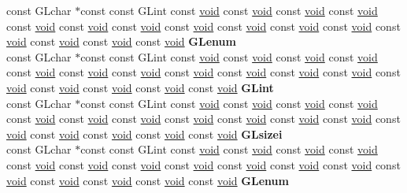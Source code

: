 \begin{DoxyCompactItemize}
\begin{tabbing}
\>const GLchar $\ast$const const GLint const \hyperlink{interfacevoid}{void} const \hyperlink{interfacevoid}{void} const \hyperlink{interfacevoid}{void} const \hyperlink{interfacevoid}{void} const \hyperlink{interfacevoid}{void} const \hyperlink{interfacevoid}{void} const \hyperlink{interfacevoid}{void} const \hyperlink{interfacevoid}{void} const \hyperlink{interfacevoid}{void} const \hyperlink{interfacevoid}{void} const \hyperlink{interfacevoid}{void} const \hyperlink{interfacevoid}{void} const \hyperlink{interfacevoid}{void} const \hyperlink{interfacevoid}{void} const \hyperlink{interfacevoid}{void} {\bfseries GLenum}\\
\>const GLchar $\ast$const const GLint const \hyperlink{interfacevoid}{void} const \hyperlink{interfacevoid}{void} const \hyperlink{interfacevoid}{void} const \hyperlink{interfacevoid}{void} const \hyperlink{interfacevoid}{void} const \hyperlink{interfacevoid}{void} const \hyperlink{interfacevoid}{void} const \hyperlink{interfacevoid}{void} const \hyperlink{interfacevoid}{void} const \hyperlink{interfacevoid}{void} const \hyperlink{interfacevoid}{void} const \hyperlink{interfacevoid}{void} const \hyperlink{interfacevoid}{void} const \hyperlink{interfacevoid}{void} const \hyperlink{interfacevoid}{void} const \hyperlink{interfacevoid}{void} {\bfseries GLint}\\
\>const GLchar $\ast$const const GLint const \hyperlink{interfacevoid}{void} const \hyperlink{interfacevoid}{void} const \hyperlink{interfacevoid}{void} const \hyperlink{interfacevoid}{void} const \hyperlink{interfacevoid}{void} const \hyperlink{interfacevoid}{void} const \hyperlink{interfacevoid}{void} const \hyperlink{interfacevoid}{void} const \hyperlink{interfacevoid}{void} const \hyperlink{interfacevoid}{void} const \hyperlink{interfacevoid}{void} const \hyperlink{interfacevoid}{void} const \hyperlink{interfacevoid}{void} const \hyperlink{interfacevoid}{void} const \hyperlink{interfacevoid}{void} const \hyperlink{interfacevoid}{void} {\bfseries GLsizei}\\
\>const GLchar $\ast$const const GLint const \hyperlink{interfacevoid}{void} const \hyperlink{interfacevoid}{void} const \hyperlink{interfacevoid}{void} const \hyperlink{interfacevoid}{void} const \hyperlink{interfacevoid}{void} const \hyperlink{interfacevoid}{void} const \hyperlink{interfacevoid}{void} const \hyperlink{interfacevoid}{void} const \hyperlink{interfacevoid}{void} const \hyperlink{interfacevoid}{void} const \hyperlink{interfacevoid}{void} const \hyperlink{interfacevoid}{void} const \hyperlink{interfacevoid}{void} const \hyperlink{interfacevoid}{void} const \hyperlink{interfacevoid}{void} const \hyperlink{interfacevoid}{void} {\bfseries GLenum}\\

\end{tabbing}
\end{DoxyCompactItemize}
